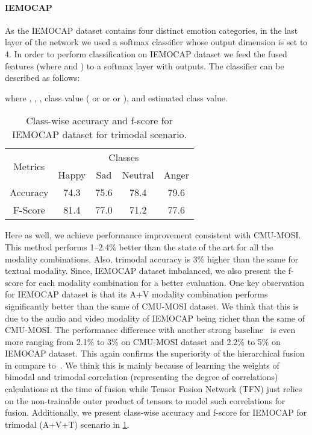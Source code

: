 \documentclass[review]{elsarticle}
\newcommand\?[1]{\hl{#1}}
\begin{document}
\paragraph{IEMOCAP}
As the IEMOCAP dataset contains four distinct emotion categories, in the last layer of the network we used a softmax classifier whose output dimension is set to 4. 
In order to perform classification on IEMOCAP dataset we feed the fused features  (where
 and ) to a softmax layer with 
outputs. The classifier can be described as follows:

where ,
, , 
class value ( or  or  or ), and  estimated class value.

\begin{table}[t]
    \centering
        \caption{Class-wise accuracy and f-score for IEMOCAP dataset for trimodal scenario.}
\begin{tabular}[t]{ccccc}
      \hline
      \multirow{2}{*}{Metrics} & \multicolumn{4}{c}{Classes}\\
      \cline{2-5} & Happy & Sad & Neutral & Anger\\
      \hline
      Accuracy & 74.3 & 75.6 & 78.4 & 79.6 \\
      F-Score & 81.4 & 77.0 & 71.2 & 77.6 \\
      \hline
    \end{tabular}
\label{table:iemocap-classwise}
\end{table}
Here as well, we achieve performance improvement consistent with CMU-MOSI. This
method performs 1--2.4\% better than the state of the art for all the modality
combinations. Also, trimodal accuracy is 3\% higher than the same for textual
modality. Since, IEMOCAP dataset imbalanced, we also present the f-score for each modality combination for a better evaluation. One key observation for IEMOCAP dataset is that its A+V modality
combination performs significantly better than the same of CMU-MOSI dataset. We
think that this is due to the audio and video modality of IEMOCAP being richer than
the same of CMU-MOSI. The performance difference with another strong baseline~\citep{zadten} is even more ranging from 2.1\% to 3\% on CMU-MOSI dataset and 2.2\% to 5\% on IEMOCAP dataset. This again confirms the superiority of the hierarchical fusion in compare to~\citep{zadten}. We think this is mainly because of learning the weights of bimodal and trimodal correlation (representing the degree of correlations) calculations at the time of fusion while Tensor Fusion Network (TFN) just relies on the non-trainable outer product of tensors to model such correlations for fusion.
Additionally, we present class-wise accuracy and f-score for IEMOCAP for trimodal (A+V+T) scenario in \cref{table:iemocap-classwise}.
\end{document}
